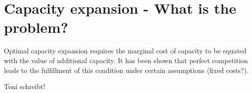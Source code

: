 \section{Capacity expansion - What is the problem?}

Optimal capacity expansion requires the marginal cost of capacity to be equated with the value of additional capacity. It has been shown that perfect competition leads to the fulfillment of this condition under certain assumptions (fixed costs?). 

\cite{Fehr1994}

Toni schreibt!